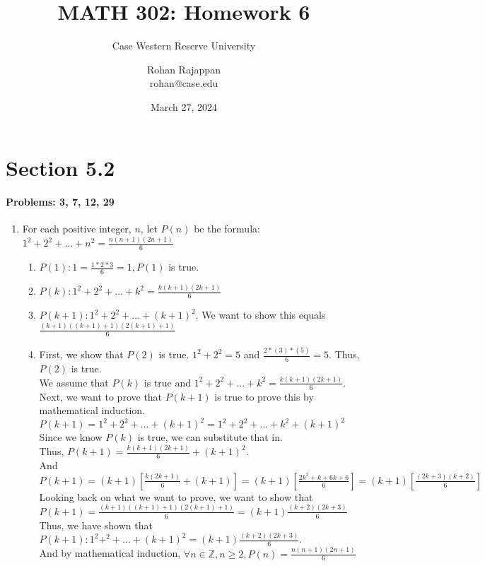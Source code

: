\documentclass{article}
\title{MATH 302: Homework 6}
\subtitle{Case Western Reserve University}
\author{Rohan Rajappan \\rohan@case.edu}
\date{March 27, 2024}
\makeatletter
\newcommand\setItemnumber[1]{\setcounter{enum\romannumeral\@enumdepth}{\numexpr#1-1\relax}}
\makeatother
\begin{document}
\maketitle

\section{Section 5.2}
\paragraph{Problems: 3, 7, 12, 29}
\begin{enumerate}
    \setItemnumber{3}
    \item For each positive integer, $n$, let $P(n)$ be the formula:\\ $1^2+2^2+...+n^2 = \frac{n(n+1)(2n+1)}{6}$
    \begin{enumerate}
        \item $P(1): 1 = \frac{1*2*3}{6} = 1, P(1)$ is true.
        \item $P(k): 1^2+2^2+...+k^2 = \frac{k(k+1)(2k+1)}{6} $
        \item $P(k+1):1^2+2^2+...+(k+1)^2$. We want to show this equals $\frac{(k+1)((k+1)+1)(2(k+1)+1)}{6}$
        \item First, we show that $P(2)$ is true. $1^2+2^2 = 5$ and $\frac{2*(3)*(5)}{6} = 5$. Thus, $P(2)$ is true.\\
        We assume that $P(k)$ is true and $1^2+2^2+...+k^2 = \frac{k(k+1)(2k+1)}{6}$. \\
        Next, we want to prove that $P(k+1)$ is true to prove this by mathematical induction. $P(k+1)=1^2+2^2+...+(k+1)^2 =1^2+2^2+...+k^2+(k+1)^2 $ \\
        Since we know $P(k)$ is true, we can substitute that in. \\Thus, $P(k+1) = \frac{k(k+1)(2k+1)}{6}+(k+1)^2 $.\\
        And $P(k+1) = (k+1)[\frac{k(2k+1)}{6}+(k+1)] = (k+1)[\frac{2k^2+k+6k+6}{6}] = (k+1)[\frac{(2k+3)(k+2)}{6}]$\\
        Looking back on what we want to prove, we want to show that $P(k+1) = \frac{(k+1)((k+1)+1)(2(k+1)+1)}{6} = (k+1)\frac{(k+2)(2k+3)}{6}$\\
        Thus, we have shown that \\$P(k+1): 1^2+^2+...+(k+1)^2 = (k+1)\frac{(k+2)(2k+3)}{6}$. \\And by mathematical induction, $\forall n\in\mathbb{Z}, n\geq2, P(n) = \frac{n(n+1)(2n+1)}{6}$

\end{enumerate}
\end{enumerate}
\end{document}

